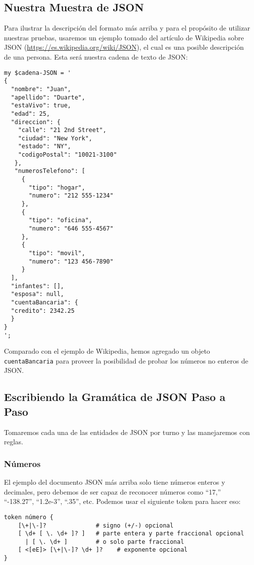 \subsection{Nuestra Muestra de JSON}


Para ilustrar la descripción del formato más arriba y para
el propósito de utilizar nuestras pruebas, usaremos un ejemplo
tomado del artículo de Wikipedia sobre JSON
(\url{https://es.wikipedia.org/wiki/JSON}), el cual es una
posible descripción de una persona. Esta será nuestra cadena
de texto de JSON:

\begin{verbatim}
my $cadena-JSON = '
{
  "nombre": "Juan",
  "apellido": "Duarte",
  "estaVivo": true,
  "edad": 25,
  "direccion": {
    "calle": "21 2nd Street",
	"ciudad": "New York",
	"estado": "NY",
	"codigoPostal": "10021-3100"
   },
   "numerosTelefono": [
     {
       "tipo": "hogar",
       "numero": "212 555-1234"
     },
     {
       "tipo": "oficina",
       "numero": "646 555-4567"
     },
     {
       "tipo": "movil",
       "numero": "123 456-7890"
     }
  ],
  "infantes": [],
  "esposa": null,  
  "cuentaBancaria": {
  "credito": 2342.25
  }
}
';
\end{verbatim}

Comparado con el ejemplo de Wikipedia, hemos agregado
un objeto \verb|cuentaBancaria| para proveer la posibilidad
de probar los números no enteros de JSON.
 
\subsection{Escribiendo la Gramática de JSON Paso a Paso}

Tomaremos cada una de las entidades de JSON por turno y 
las manejaremos con reglas.

\subsubsection{Números}

El ejemplo del documento JSON más arriba solo tiene números enteros
y decimales, pero debemos de ser capaz de reconocer números
como ``17,'' ``-138.27'', ``1.2e-3'', ``.35'', etc. Podemos usar el
siguiente token para hacer eso:

\begin{verbatim}
token número {
    [\+|\-]?              # signo (+/-) opcional
    [ \d+ [ \. \d+ ]? ]   # parte entera y parte fraccional opcional
      | [ \. \d+ ]        # o solo parte fraccional
    [ <[eE]> [\+|\-]? \d+ ]?    # exponente opcional
}
\end{verbatim}

